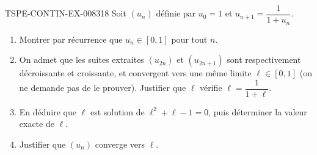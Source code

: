 \begin{exercice}{TSPE-CONTIN-EX-008}{3}{18}
Soit $(u_n)$ définie par $u_0 = 1$ et $u_{n+1} = \dfrac{1}{1+u_n}$.
\begin{enumerate}
  \item Montrer par récurrence que $u_n \in [0, 1]$ pour tout $n$.
  \item On admet que les suites extraites $(u_{2n})$ et $(u_{2n+1})$ sont respectivement décroissante et croissante, et convergent vers une même limite $\ell \in [0,1]$ (on ne demande pas de le prouver). Justifier que $\ell$ vérifie $\ell = \dfrac{1}{1+\ell}$.
  \item En déduire que $\ell$ est solution de $\ell^2 + \ell - 1 = 0$, puis déterminer la valeur exacte de $\ell$.
  \item Justifier que $(u_n)$ converge vers $\ell$.
\end{enumerate}
\end{exercice}
